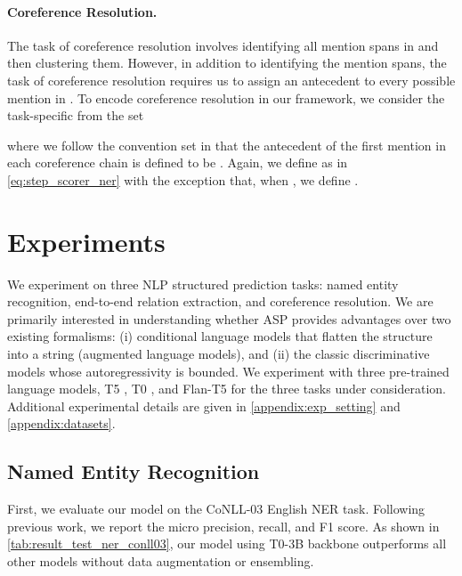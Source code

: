 \documentclass[11pt]{article}
\begin{document}
\paragraph{Coreference Resolution.} 

The task of coreference resolution involves identifying all mention spans  in  and then clustering them.
However, in addition to identifying the mention spans, the task of coreference resolution requires us to assign an antecedent to every possible mention in .
To encode coreference resolution in our framework, we consider the task-specific  from the set

where we follow the convention set in \citet{lee-etal-2017-end} that the antecedent of the first mention in each coreference chain is defined to be .
Again, we define  as in \cref{eq:step_scorer_ner} with the exception that, when , we define . 
 
\section{Experiments}
We experiment on three NLP structured prediction tasks: named entity recognition, end-to-end relation extraction, and coreference resolution.
We are primarily interested in understanding whether ASP provides advantages over two existing formalisms: (i) conditional language models \citep{athiwaratkun-etal-2020-augmented, tanl} that flatten the structure into a string (augmented language models), and (ii) the classic discriminative models whose autoregressivity is bounded.
We experiment with three pre-trained language models, T5 \cite{raffel-t5}, T0 \cite{sanh2021multitask}, and Flan-T5 \cite{flant5} for the three tasks under consideration.
Additional experimental details are given in \cref{appendix:exp_setting} and \cref{appendix:datasets}.

\subsection{Named Entity Recognition}
First, we evaluate our model on the CoNLL-03 English NER task. Following previous work, we report the micro precision, recall, and F1 score. 
As shown in \cref{tab:result_test_ner_conll03}, our model using T0-3B backbone outperforms all other models without data augmentation or ensembling.
\end{document}
